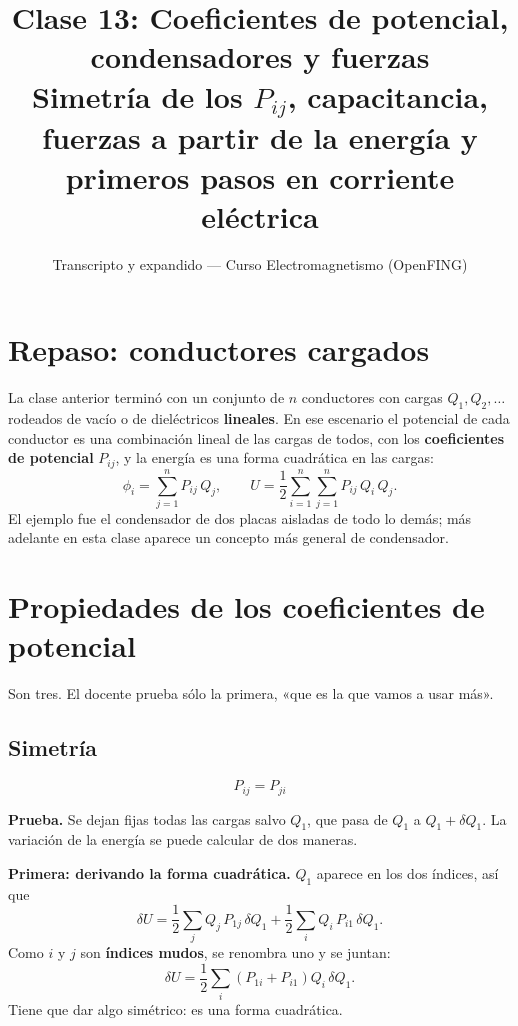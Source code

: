 \documentclass[12pt,a4paper]{article}
\title{\textbf{Clase 13: Coeficientes de potencial, condensadores y fuerzas} \\[0.3em]
        \large{Simetría de los $P_{ij}$, capacitancia, fuerzas a partir de la energía y primeros pasos en corriente eléctrica}}
\author{Transcripto y expandido --- Curso Electromagnetismo (OpenFING)}
\date{}
\begin{document}
\maketitle
\thispagestyle{empty}
\newpage

\tableofcontents
\newpage

\section{Repaso: conductores cargados}

La clase anterior terminó con un conjunto de $n$ conductores con cargas
$Q_1, Q_2, \dots$ rodeados de vacío o de dieléctricos \textbf{lineales}. En ese
escenario el potencial de cada conductor es una combinación lineal de las cargas
de todos, con los \textbf{coeficientes de potencial} $P_{ij}$, y la energía es una
forma cuadrática en las cargas:
\[
\phi_i = \sum_{j=1}^{n} P_{ij}\,Q_j,
\qquad
U = \frac12\sum_{i=1}^{n}\sum_{j=1}^{n} P_{ij}\,Q_i\,Q_j .
\]
El ejemplo fue el condensador de dos placas aisladas de todo lo demás; más
adelante en esta clase aparece un concepto más general de condensador.

\section{Propiedades de los coeficientes de potencial}

Son tres. El docente prueba sólo la primera, «que es la que vamos a usar más».

\subsection{Simetría}

\begin{keybox}
\[
\boxed{\ P_{ij} = P_{ji}\ }
\]
\end{keybox}

\textbf{Prueba.} Se dejan fijas todas las cargas salvo $Q_1$, que pasa de $Q_1$ a
$Q_1+\delta Q_1$. La variación de la energía se puede calcular de dos maneras.

\textbf{Primera: derivando la forma cuadrática.} $Q_1$ aparece en los dos
índices, así que
\[
\delta U = \frac12\sum_{j} Q_j\,P_{1j}\,\delta Q_1 + \frac12\sum_{i} Q_i\,P_{i1}\,\delta Q_1 .
\]
Como $i$ y $j$ son \textbf{índices mudos}, se renombra uno y se juntan:
\[
\delta U = \frac12\sum_i \left(P_{1i}+P_{i1}\right) Q_i\,\delta Q_1 .
\]
Tiene que dar algo simétrico: es una forma cuadrática.
\end{document}
